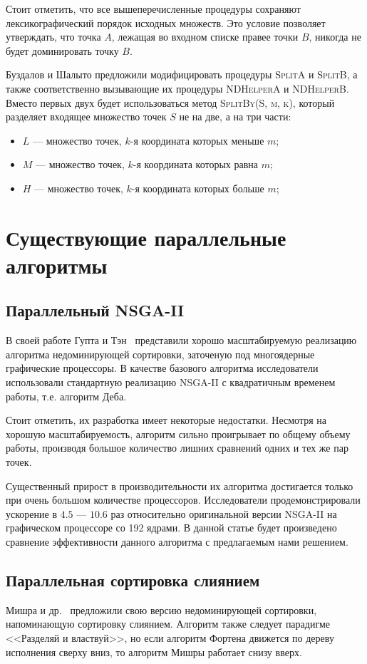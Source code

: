 Стоит отметить, что все вышеперечисленные процедуры сохраняют лексикографический порядок исходных множеств.
Это условие позволяет утверждать, что точка $A$, лежащая во входном списке правее точки $B$, никогда не будет доминировать точку $B$.

Буздалов и Шалыто предложили модифицировать процедуры \textsc{SplitA} и \textsc{SplitB}, а также соответственно вызывающие их процедуры \textsc{NDHelperA} и \textsc{NDHelperB}.
Вместо первых двух будет использоваться метод \textsc{SplitBy(S, m, k)}, который разделяет входящее множество точек $S$ не на две, а на три части:
\begin{itemize}
    \item $L$ --- множество точек, $k$-я координата которых меньше $m$;
    \item $M$ --- множество точек, $k$-я координата которых равна $m$;
    \item $H$ --- множество точек, $k$-я координата которых больше $m$;
\end{itemize}



\section{Существующие параллельные алгоритмы}
\subsection{Параллельный NSGA-II}
В своей работе Гупта и Тэн~\cite{gupta15} представили хорошо масштабируемую реализацию алгоритма недоминирующей сортировки, заточеную под многоядерные графические процессоры.
В качестве базового алгоритма исследователи использовали стандартную реализацию NSGA-II с квадратичным временем работы, т.е. алгоритм Деба.

Стоит отметить, их разработка имеет некоторые недостатки.
Несмотря на хорошую масштабируемость, алгоритм сильно проигрывает по общему объему работы, производя большое количество лишних сравнений одних и тех же пар точек.

Существенный прирост в производительности их алгоритма достигается только при очень большом количестве процессоров. 
Исследователи продемонстрировали ускорение в $4.5$ --- $10.6$ раз относительно оригинальной версии NSGA-II на графическом процессоре со 192 ядрами.
В данной статье будет произведено сравнение эффективности данного алгоритма с предлагаемым нами решением.

\subsection{Параллельная сортировка слиянием}
Мишра и др.~\cite{mishra16} предложили свою версию недоминирующей сортировки, напоминающую сортировку слиянием.
Алгоритм также следует парадигме <<Разделяй и властвуй>>, но если алгоритм Фортена движется по дереву исполнения сверху вниз, то алгоритм Мишры работает снизу вверх.

